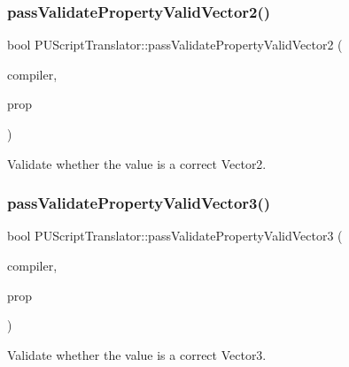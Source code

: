 \subsubsection{\texorpdfstring{pass\+Validate\+Property\+Valid\+Vector2()}{passValidatePropertyValidVector2()}\hspace{0.1cm}{\footnotesize\ttfamily [2/2]}}
{\footnotesize\ttfamily bool P\+U\+Script\+Translator\+::pass\+Validate\+Property\+Valid\+Vector2 (\begin{DoxyParamCaption}\item[{\hyperlink{classPUScriptCompiler}{P\+U\+Script\+Compiler} $\ast$}]{compiler,  }\item[{\hyperlink{classPUPropertyAbstractNode}{P\+U\+Property\+Abstract\+Node} $\ast$}]{prop }\end{DoxyParamCaption})}

Validate whether the value is a correct Vector2. \mbox{\label{classPUScriptTranslator_a26d5b40eb43a7441b54bfd7534cff111}} 
\subsubsection{\texorpdfstring{pass\+Validate\+Property\+Valid\+Vector3()}{passValidatePropertyValidVector3()}\hspace{0.1cm}{\footnotesize\ttfamily [1/2]}}
{\footnotesize\ttfamily bool P\+U\+Script\+Translator\+::pass\+Validate\+Property\+Valid\+Vector3 (\begin{DoxyParamCaption}\item[{\hyperlink{classPUScriptCompiler}{P\+U\+Script\+Compiler} $\ast$}]{compiler,  }\item[{\hyperlink{classPUPropertyAbstractNode}{P\+U\+Property\+Abstract\+Node} $\ast$}]{prop }\end{DoxyParamCaption})}

Validate whether the value is a correct Vector3. \mbox{\label{classPUScriptTranslator_a26d5b40eb43a7441b54bfd7534cff111}} 

